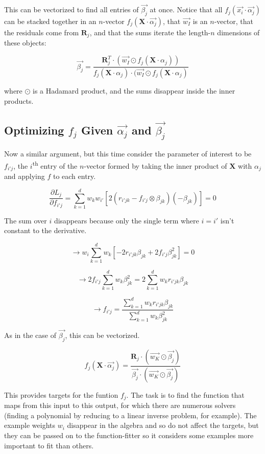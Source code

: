 \documentclass[12pt]{article}
\begin{document}
This can be vectorized to find all entries of $\vec{\beta_j}$ at once. Notice that all $f_j(\vec{x_i} \cdot \vec{\alpha_j})$ can be stacked together in an $n$-vector $f_j(\pmb{X} \cdot \vec{\alpha_j})$, that $\vec{w_I}$ is an $n$-vector, that the residuals come from $\pmb{R}_j$, and that the sums iterate the length-$n$ dimensions of these objects:

$$ \vec{\beta_j} = \frac{\pmb{R}_j^T \cdot (\vec{w_I} \odot f_j(\pmb{X} \cdot \alpha_j))}{f_j(\pmb{X} \cdot \alpha_j) \cdot (\vec{w_I} \odot f_j(\pmb{X} \cdot \alpha_j)}$$

where $\odot$ is a Hadamard product, and the sums disappear inside the inner products.

\subsection{Optimizing $f_j$ Given $\vec{\alpha_j}$ and $\vec{\beta_j}$}

Now a similar argument, but this time consider the parameter of interest to be $f_{i'j}$, the $i$\textsuperscript{th} entry of the $n$-vector formed by taking the inner product of $\pmb{X}$ with $\alpha_j$ and applying $f$ to each entry.


$$\frac{\partial L_j}{\partial f_{i'j}} = \sum_{k=1}^d w_k w_{i'} [2(r_{i'jk} - f_{i'j} \otimes \beta_{jk})(-\beta_{jk})] = 0$$

The sum over $i$ disappears because only the single term where $i=i'$ isn't constant to the derivative.

$$\rightarrow w_i \sum_{k=1}^d w_k [-2 r_{i'jk} \beta_{jk} + 2 f_{i'j} \beta_{jk}^2 ] = 0$$

$$\rightarrow 2 f_{i'j} \sum_{k=1}^d w_k \beta_{jk}^2 = 2 \sum_{k=1}^d w_k r_{i'jk} \beta_{jk}$$

$$\rightarrow f_{i'j} = \frac{\sum_{k=1}^d w_k r_{i'jk} \beta_{jk}}{\sum_{k=1}^d w_k \beta_{jk}^2}$$

As in the case of $\vec{\beta_j}$, this can be vectorized.

$$ f_j(\pmb{X} \cdot \vec{\alpha_j}) = \frac{\pmb{R}_j \cdot (\vec{w_K} \odot \vec{\beta_j})}{\vec{\beta_j} \cdot (\vec{w_K} \odot \vec{\beta_j})}$$

This provides targets for the funtion $f_j$. The task is to find the function that maps from this input to this output, for which there are numerous solvers (finding a polynomial by reducing to a linear inverse problem, for example). The example weights $w_i$ disappear in the algebra and so do not affect the targets, but they can be passed on to the function-fitter so it considers some examples more important to fit than others.
\end{document}
